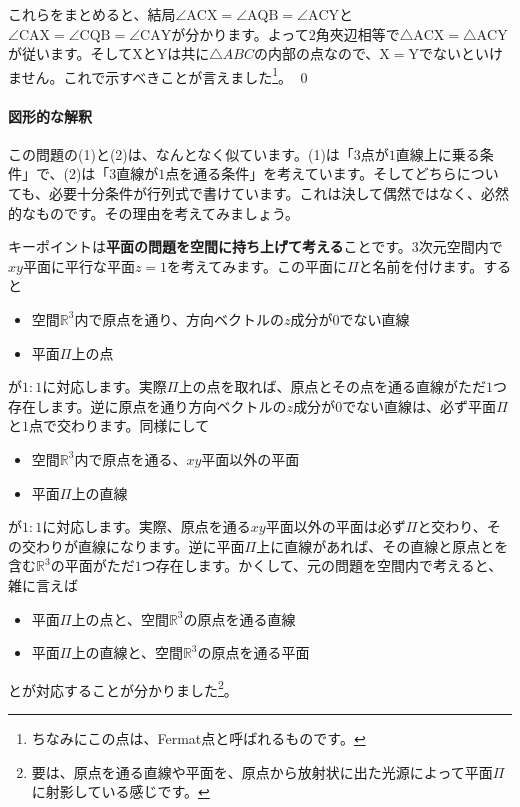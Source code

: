 これらをまとめると、結局$\angle\mathrm{ACX} = \angle\mathrm{AQB} = \angle\mathrm{ACY}$と$\angle\mathrm{CAX} = \angle\mathrm{CQB} = \angle\mathrm{CAY}$が分かります。よって$2$角夾辺相等で$\bigtriangleup\mathrm{ACX} = \bigtriangleup\mathrm{ACY}$が従います。そして$\mathrm{X}$と$\mathrm{Y}$は共に$\bigtriangleup{ABC}$の内部の点なので、$\mathrm{X} = \mathrm{Y}$でないといけません。これで示すべきことが言えました\footnote{ちなみにこの点は、Fermat点と呼ばれるものです。}。 \qed

\paragraph{図形的な解釈}

この問題の(1)と(2)は、なんとなく似ています。(1)は「$3$点が$1$直線上に乗る条件」で、(2)は「$3$直線が$1$点を通る条件」を考えています。そしてどちらについても、必要十分条件が行列式で書けています。これは決して偶然ではなく、必然的なものです。その理由を考えてみましょう。

キーポイントは\textbf{平面の問題を空間に持ち上げて考える}ことです。$3$次元空間内で$xy$平面に平行な平面$z = 1$を考えてみます。この平面に$\Pi$と名前を付けます。すると
\begin{itemize}
\item 空間$\mathbb{R}^3$内で原点を通り、方向ベクトルの$z$成分が$0$でない直線
\item 平面$\Pi$上の点
\end{itemize}
が$1:1$に対応します。実際$\Pi$上の点を取れば、原点とその点を通る直線がただ$1$つ存在します。逆に原点を通り方向ベクトルの$z$成分が$0$でない直線は、必ず平面$\Pi$と$1$点で交わります。同様にして
\begin{itemize}
\item 空間$\mathbb{R}^3$内で原点を通る、$xy$平面以外の平面
\item 平面$\Pi$上の直線
\end{itemize}
が$1:1$に対応します。実際、原点を通る$xy$平面以外の平面は必ず$\Pi$と交わり、その交わりが直線になります。逆に平面$\Pi$上に直線があれば、その直線と原点とを含む$\mathbb{R}^3$の平面がただ$1$つ存在します。かくして、元の問題を空間内で考えると、雑に言えば
\begin{itemize}
\item 平面$\Pi$上の点と、空間$\mathbb{R}^3$の原点を通る直線
\item 平面$\Pi$上の直線と、空間$\mathbb{R}^3$の原点を通る平面
\end{itemize}
とが対応することが分かりました\footnote{要は、原点を通る直線や平面を、原点から放射状に出た光源によって平面$\Pi$に射影している感じです。}。

